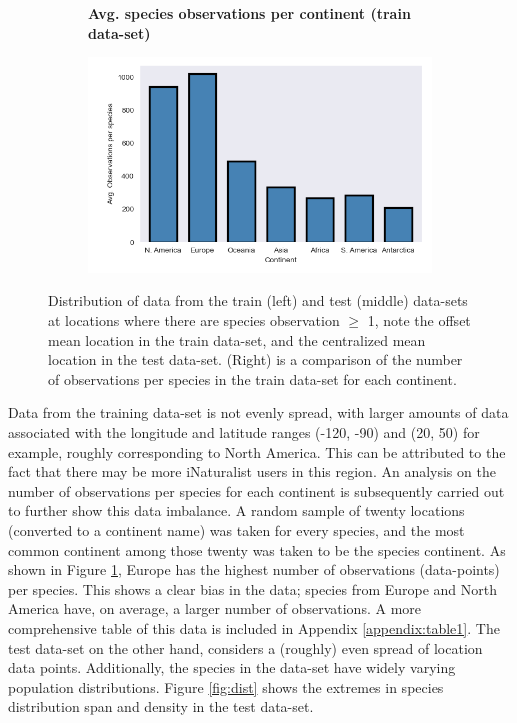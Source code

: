 \begin{figure}[hbt!]
\begin{subfigure}{.32\linewidth}
\end{subfigure}
\begin{subfigure}{.32\linewidth}
\vspace*{-1ex}  
\begin{center}
\textbf{Avg. species observations per continent (train data-set)}
\end{center}
\vspace*{-1ex}
  \includegraphics[width=\linewidth]{Images/obsve.png}
\end{subfigure}

\caption{Distribution of data from the train (left) and test (middle) data-sets at locations where there are species observation $\geq$ 1, note the offset mean location in the train data-set, and the centralized mean location in the test data-set. (Right) is a comparison of the number of observations per species in the train data-set for each continent.}
\label{fig:dist_data}
\end{figure}

Data from the training data-set is not evenly spread, with larger amounts of data associated with the longitude and latitude ranges (-120, -90) and (20, 50) for example, roughly corresponding to North America. This can be attributed to the fact that there may be more iNaturalist users in this region.
An analysis on the number of observations per species for each continent is subsequently carried out to further show this data imbalance.
A random sample of twenty locations (converted to a continent name) was taken for every species, and the most common continent among those twenty was taken to be the species continent. As shown in Figure \ref{fig:dist_data}, Europe has the highest number of observations (data-points) per species. This shows a clear bias in the data; species from Europe and North America have, on average, a larger number of observations. A more comprehensive table of this data is included in Appendix \ref{appendix:table1}. The test data-set on the other hand, considers a (roughly) even spread of location data points. Additionally, the species in the data-set have widely varying population distributions. 
Figure \ref{fig:dist} shows the extremes in species distribution span and density in the test data-set.

